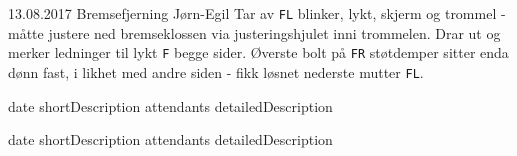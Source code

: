 \worklogitem
	{13.08.2017}
	{Bremsefjerning}
	{J\o rn-Egil}
	{Tar av \texttt{FL} blinker, lykt, skjerm og trommel - måtte justere ned bremseklossen via justeringshjulet inni trommelen. Drar ut og merker ledninger til lykt \texttt{F} begge sider. Øverste bolt på \texttt{FR} støtdemper sitter enda dønn fast, i likhet med andre siden - fikk løsnet nederste mutter \texttt{FL}.}

\worklogitem
	{date}
	{shortDescription}
	{attendants}
	{detailedDescription}

\worklogitem
	{date}
	{shortDescription}
	{attendants}
	{detailedDescription}
